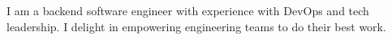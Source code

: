 
\begin{cvparagraph}

	I am a backend software engineer with experience with DevOps and tech
	leadership. I delight in empowering engineering teams to do their best work.

\end{cvparagraph}
